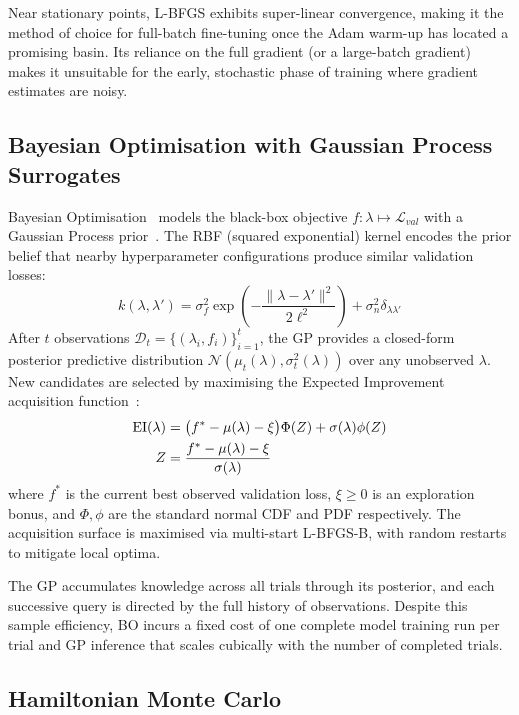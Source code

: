 \documentclass[11pt]{article}
\begin{document}
Near stationary points, L-BFGS exhibits super-linear convergence,
making it the method of choice for full-batch fine-tuning once the
Adam warm-up has located a promising basin.  Its reliance on the full
gradient (or a large-batch gradient) makes it unsuitable for the
early, stochastic phase of training where gradient estimates are noisy.

\subsection{Bayesian Optimisation with Gaussian Process Surrogates}

Bayesian Optimisation~\cite{snoek2012} models the black-box objective
$f: \lambda \mapsto \mathcal{L}_{val}$ with a Gaussian Process
prior~\cite{rasmussen2006}.  The RBF (squared exponential) kernel
encodes the prior belief that nearby hyperparameter configurations
produce similar validation losses:
\begin{equation}
k(\lambda,\lambda') = \sigma_f^2\exp\!\left(-\frac{\|\lambda-\lambda'\|^2}{2\ell^2}\right)
+\sigma_n^2\delta_{\lambda\lambda'}
\label{eq:rbf}
\end{equation}
After $t$ observations $\mathcal{D}_t = \{(\lambda_i, f_i)\}_{i=1}^t$,
the GP provides a closed-form posterior predictive distribution
$\mathcal{N}(\mu_t(\lambda), \sigma_t^2(\lambda))$ over any
unobserved $\lambda$.  New candidates are selected by maximising the
Expected Improvement acquisition function~\cite{mockus1975}:
\begin{align}
\mathrm{EI}(\lambda) &=
  \bigl(f^*-\mu(\lambda)-\xi\bigr)\Phi(Z)
  +\sigma(\lambda)\phi(Z)
\label{eq:ei}\\
Z &= \frac{f^*-\mu(\lambda)-\xi}{\sigma(\lambda)} \notag
\end{align}
where $f^*$ is the current best observed validation loss,
$\xi \ge 0$ is an exploration bonus, and $\Phi, \phi$ are the
standard normal CDF and PDF respectively.  The acquisition surface is
maximised via multi-start L-BFGS-B, with random restarts to mitigate
local optima.

The GP accumulates knowledge across all trials through its posterior,
and each successive query is directed by the full history of
observations.  Despite this sample efficiency, BO incurs a fixed cost
of one complete model training run per trial and GP inference that
scales cubically with the number of completed trials.

\subsection{Hamiltonian Monte Carlo}
\end{document}
